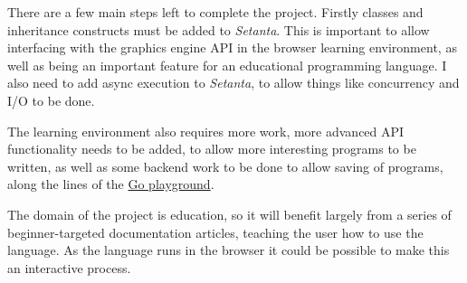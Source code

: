 \documentclass[11pt]{extarticle}
\newcommand{\Setanta}{\emph{Setanta}}
\begin{document}
    There are a few main steps left to complete the project. Firstly classes and inheritance constructs must be added to \Setanta{}. This is important to allow interfacing with the graphics engine API in the browser learning environment, as well as being an important feature for an educational programming language. I also need to add async execution to \Setanta{}, to allow things like concurrency and I/O to be done.

    The learning environment also requires more work, more advanced API functionality needs to be added, to allow more interesting programs to be written, as well as some backend work to be done to allow saving of programs, along the lines of the \href{https://play.golang.org}{Go playground}.

    The domain of the project is education, so it will benefit largely from a series of beginner-targeted documentation articles, teaching the user how to use the language. As the language runs in the browser it could be possible to make this an interactive process.
\end{document}
